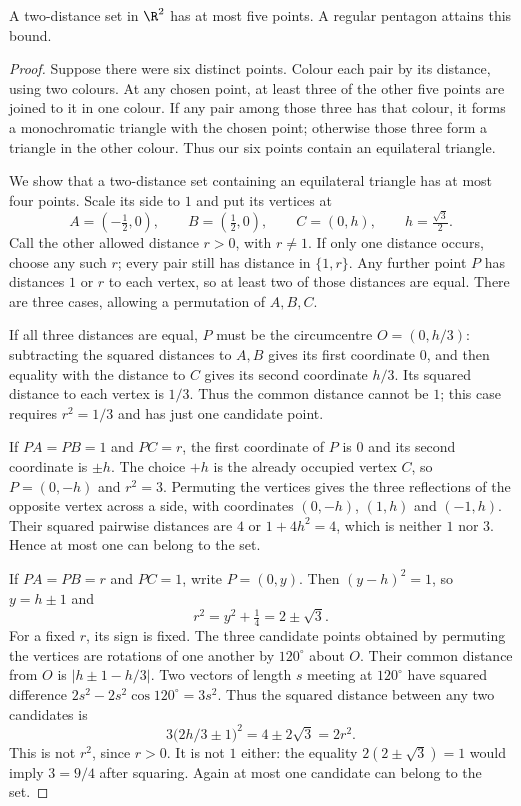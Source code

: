 \begin{proposition}\label{combinatorial:prop:planarmax}
A two-distance set in $\R^2$ has at most five points. A regular pentagon
attains this bound.
\end{proposition}
\begin{proof}
Suppose there were six distinct points. Colour each pair by its distance,
using two colours. At any chosen point, at least three of the other five
points are joined to it in one colour. If any pair among those three has
that colour, it forms a monochromatic triangle with the chosen point;
otherwise those three form a triangle in the other colour. Thus our six
points contain an equilateral triangle.

We show that a two-distance set containing an equilateral triangle has
at most four points. Scale its side to $1$ and put its vertices at
\[
 A=(-\tfrac12,0),\qquad B=(\tfrac12,0),\qquad
 C=(0,h),\qquad h=\tfrac{\sqrt3}{2}.
\]
Call the other allowed distance $r>0$, with $r\ne1$. If only one distance
occurs, choose any such $r$; every pair still has distance in $\{1,r\}$.
Any further point $P$ has distances $1$ or
$r$ to each vertex, so at least two of those distances are equal.
There are three cases, allowing a permutation of $A,B,C$.

If all three distances are equal, $P$ must be the circumcentre
$O=(0,h/3)$: subtracting the squared distances to $A,B$ gives its first
coordinate $0$, and then equality with the distance to $C$ gives its
second coordinate $h/3$. Its squared distance to each vertex is $1/3$.
Thus the common distance cannot be $1$; this case requires $r^2=1/3$
and has just one candidate point.

If $PA=PB=1$ and $PC=r$, the first coordinate of $P$ is $0$ and its
second coordinate is $\pm h$. The choice $+h$ is the already occupied
vertex $C$, so $P=(0,-h)$ and $r^2=3$. Permuting the vertices gives the
three reflections of the opposite vertex across a side, with coordinates
$(0,-h)$, $(1,h)$ and $(-1,h)$. Their squared pairwise distances are
$4$ or $1+4h^2=4$, which is neither $1$ nor $3$.
Hence at most one can belong to the set.

If $PA=PB=r$ and $PC=1$, write $P=(0,y)$. Then
$(y-h)^2=1$, so $y=h\pm1$ and
\[
 r^2=y^2+\tfrac14=2\pm\sqrt3.
\]
For a fixed $r$, its sign is fixed. The three candidate points obtained
by permuting the vertices are rotations of one another by $120^\circ$
about $O$. Their common distance from $O$ is $|h\pm1-h/3|$.
Two vectors of length $s$ meeting at $120^\circ$ have squared difference
$2s^2-2s^2\cos120^\circ=3s^2$. Thus the squared distance between any two
candidates is
\[
 3\bigl(2h/3\pm1\bigr)^2=4\pm2\sqrt3=2r^2.
\]
This is not $r^2$, since $r>0$. It is not $1$ either: the equality
$2(2\pm\sqrt3)=1$ would imply $3=9/4$ after squaring.
Again at most one candidate can belong to the set.


\end{proof}

